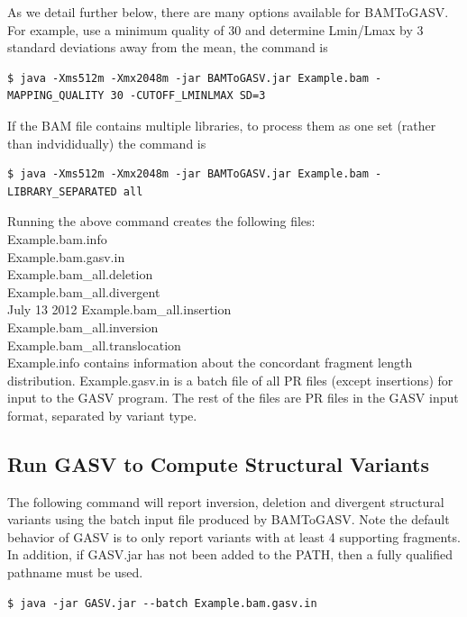\documentclass[11pt]{article}
\begin{document}
As we detail further below, there are many options available for BAMToGASV. For example, use a minimum quality of $30$ and determine Lmin/Lmax by 3 standard deviations away from the mean, the command is

{\scriptsize
\begin{Verbatim}[frame=single]
 $ java -Xms512m -Xmx2048m -jar BAMToGASV.jar Example.bam -MAPPING_QUALITY 30 -CUTOFF_LMINLMAX SD=3
\end{Verbatim}
}

If the BAM file contains multiple libraries, to process them as one set (rather than indvididually) the command is
{\small
\begin{Verbatim}[frame=single]
$ java -Xms512m -Xmx2048m -jar BAMToGASV.jar Example.bam -LIBRARY_SEPARATED all
\end{Verbatim}
}

\noindent Running the above command creates the following files:\\

\noindent Example.bam.info\\
\noindent Example.bam.gasv.in \\
\noindent Example.bam\_all.deletion \\
\noindent Example.bam\_all.divergent \\July 13 2012
\noindent Example.bam\_all.insertion \\
\noindent Example.bam\_all.inversion \\
\noindent Example.bam\_all.translocation\\

Example.info contains information about the concordant fragment length
distribution.   Example.gasv.in is a batch file of all PR files (except insertions) for input to the GASV program.
The rest of the files are PR files in the GASV input format, separated by variant type.

\subsection{Run GASV to Compute Structural Variants}

The following command will report inversion, deletion and divergent structural variants using the batch input file produced by BAMToGASV. Note the default behavior of GASV is to only report variants with at least 4 supporting fragments.  
In addition, if GASV.jar has not been added to the PATH, then a fully qualified pathname must be used.

{
\begin{Verbatim}[frame=single]
$ java -jar GASV.jar --batch Example.bam.gasv.in
\end{Verbatim}
}
\end{document}
